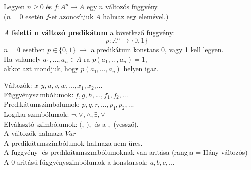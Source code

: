 \begin{frame}

\begin{tcolorbox}[title={Függvény}]
Legyen $n \geq 0$ és $f : A^n \rightarrow A$ egy $n$ változós függvény.\\
\tcblower
({\small $n = 0$ esetén $f$-et azonosítjuk $A$ halmaz egy elemével.})
\end{tcolorbox}

\begin{tcolorbox}[title={$A$ feletti n változó predikátum}]
\textbf{$A$ feletti n változó predikátum} a következő függvény:\\
$$p : A^n \rightarrow \{0, 1\}$$
\tcblower
{\small $n = 0$ esetben $p \in \{0, 1\}$ $\rightarrow$  a predikátum konstans 0, vagy 1 kell legyen.}\\
\msmallskip
{\small Ha valamely $a_1, ..., a_n \in A$-ra $p (a_1, ..., a_n) = 1$},\\
{\small akkor azt mondjuk, hogy $p(a_1, ..., a_n)$ helyen igaz.}
\end{tcolorbox}

\begin{tcolorbox}[title={Az $\mathcal{L}$ elsőrendű nyelv szimbólumai}]
Változók: $x, y, u, v, w, ..., x_1, x_2, ...$\\
Függvényszimbólumok: $f, g, h, ..., f_1, f_2, ...$\\
Predikátumszimbólumok: $p, q, r, ..., p_1, p_2, ...$\\
Logikai szimbólumok: ${\neg}, {\lor}, {\land}, {\exists}, {\forall}$\\
Elválasztó szimbólumok: $($, $),$ és a $,$ (vessző).\\
\tcblower
A változók halmaza $Var$\\
A predikátumszimbólumok halmaza nem üres.\\
A függvény- és predikátumszimbólumoknak van aritása (rangja = Hány változós)\\
A 0 aritású függvényszimbólumok a konstansok: $a, b, c, ...$
\end{tcolorbox}
\end{frame}

